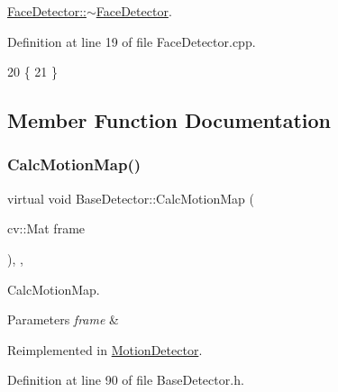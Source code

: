 \mbox{\hyperlink{class_face_detector_abcbd928d55d190c5a9f574c755ac01a6}{Face\+Detector\+::$\sim$\+Face\+Detector}}. 



Definition at line 19 of file Face\+Detector.\+cpp.


\begin{DoxyCode}
20 \{
21 \}
\end{DoxyCode}


\subsection{Member Function Documentation}
\mbox{\label{class_base_detector_a73c66f0d4dad263fcf65c09a6f6feda2}} 
\subsubsection{\texorpdfstring{Calc\+Motion\+Map()}{CalcMotionMap()}}
{\footnotesize\ttfamily virtual void Base\+Detector\+::\+Calc\+Motion\+Map (\begin{DoxyParamCaption}\item[{cv\+::\+Mat}]{frame }\end{DoxyParamCaption})\hspace{0.3cm}{\ttfamily [inline]}, {\ttfamily [virtual]}, {\ttfamily [inherited]}}



Calc\+Motion\+Map. 


\begin{DoxyParams}{Parameters}
{\em frame} & \\
\hline
\end{DoxyParams}


Reimplemented in \mbox{\hyperlink{class_motion_detector_aa4e606acafdc33a3104471903e449adc}{Motion\+Detector}}.



Definition at line 90 of file Base\+Detector.\+h.


